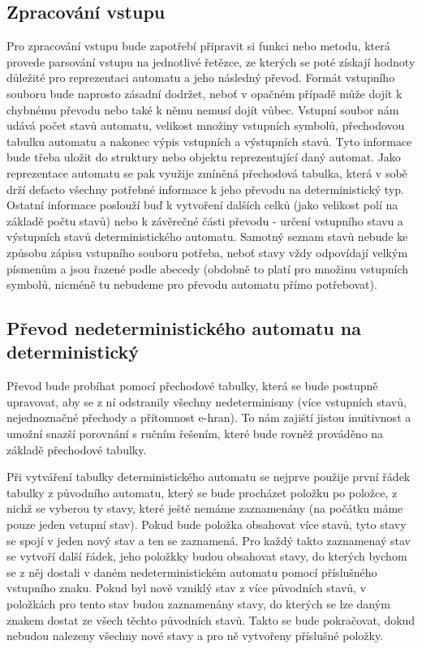 \documentclass[11pt]{article}
\begin{document}
\subsection{Zpracování vstupu}
Pro zpracování vstupu bude zapotřebí připravit si funkci nebo metodu, která provede parsování vstupu na jednotlivé řetězce, ze kterých se poté získají hodnoty důležité pro reprezentaci automatu a jeho následný převod. Formát vstupního souboru bude naprosto zásadní dodržet, neboť v opačném případě může dojít k chybnému převodu nebo také k němu nemusí dojít vůbec. Vstupní soubor nám udává počet stavů automatu, velikost množiny vstupních symbolů, přechodovou tabulku automatu a nakonec výpis vstupních a výstupních stavů. Tyto informace bude třeba uložit do struktury nebo objektu reprezentující daný automat. Jako reprezentace automatu se pak využije zmíněná přechodová tabulka, která v sobě drží defacto všechny potřebné informace k jeho převodu na deterministický typ. Ostatní informace poslouží buď k vytvoření dalších celků (jako velikost polí na základě počtu stavů) nebo k závěrečné části převodu - určení vstupního stavu a výstupních stavů deterministického automatu. Samotný seznam stavů nebude ke způsobu zápisu vstupního souboru potřeba, neboť stavy vždy odpovídají velkým písmenům a jsou řazené podle abecedy (obdobně to platí pro množinu vstupních symbolů, nicméně tu nebudeme pro převodu automatu přímo potřebovat).

\subsection{Převod nedeterministického automatu na deterministický}
Převod bude probíhat pomocí přechodové tabulky, která se bude postupně upravovat, aby se z ní odstranily všechny nedeterminismy (více vstupních stavů, nejednoznačné přechody a přítomnost e-hran). To nám zajiští jistou inuitivnost a umožní snazší porovnání s ručním řešením, které bude rovněž prováděno na základě přechodové tabulky.

Při vytváření tabulky deterministického automatu se nejprve použije první řádek tabulky z původního automatu, který se bude procházet položku po položce, z nichž se vyberou ty stavy, které ještě nemáme zaznamenány (na počátku máme pouze jeden vstupní stav). Pokud bude položka obsahovat více stavů, tyto stavy se spojí v jeden nový stav a ten se zaznamená. Pro každý takto zaznamenaý stav se vytvoří další řádek, jeho položkky budou obsahovat stavy, do kterých bychom se z něj dostali v daném nedeterministickém automatu pomocí příslušného vstupního znaku. Pokud byl nově vzniklý stav z více původních stavů, v položkách pro tento stav budou zaznamenány stavy, do kterých se lze daným znakem dostat ze všech těchto původních stavů. Takto se bude pokračovat, dokud nebudou nalezeny všechny nové stavy a pro ně vytvořeny příslušné položky.
\end{document}
